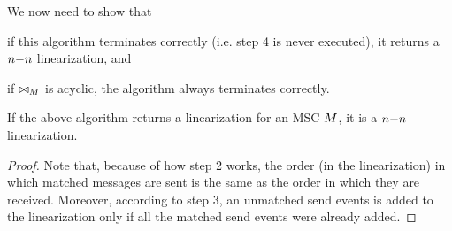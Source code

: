 We now need to show that 
\begin{enumerate*}[label={(\roman*)}]
	\item if this algorithm terminates correctly (i.e. step 4 is never executed), it returns a $n\mathsf{-}n$ linearization, and 
	\item if $\bowtie_M$ is acyclic, the algorithm always terminates correctly.
\end{enumerate*}
\begin{proposition}
	If the above algorithm returns a linearization for an MSC $M$, it is a $n\mathsf{-}n$ linearization.
\end{proposition}
\begin{proof}
	Note that, because of how step 2 works, the order (in the linearization) in which matched messages are sent is the same as the order in which they are received. Moreover, according to step 3, an unmatched send events is added to the linearization only if all the matched send events were already added.
\end{proof}

